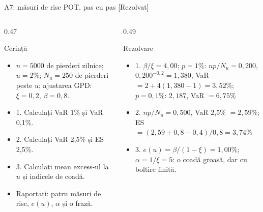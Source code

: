 \begin{frame}{A7: măsuri de risc POT, pas cu pas [Rezolvat]}
\itemsize{\scriptsize}
\begin{columns}[T]
\begin{column}{0.47\textwidth}
\begin{block}{Cerință}
\begin{itemize}
    \item $n = 5000$ de pierderi zilnice; $u = 2\%$; $N_u = 250$ de pierderi peste $u$; ajustarea GPD: $\xi = 0{,}2$, $\beta = 0{,}8$.
    \item 1. Calculați VaR 1\% și VaR 0,1\%.
    \item 2. Calculați VaR 2,5\% și ES 2,5\%.
    \item 3. Calculați mean excess-ul la $u$ și indicele de coadă.
    \item Raportați: patru măsuri de risc, $e(u)$, $\alpha$ și o frază.
\end{itemize}
\end{block}
\end{column}
\begin{column}{0.49\textwidth}
\begin{exampleblock}{Rezolvare}
\begin{itemize}
    \item 1. $\beta/\xi = 4{,}00$; $p = 1\%$: $np/N_u = 0{,}200$, $0{,}200^{-0{,}2} = 1{,}380$, VaR $= 2 + 4(1{,}380 - 1) = 3{,}52\%$; $p = 0{,}1\%$: $2{,}187$, VaR $= 6{,}75\%$
    \item 2. $np/N_u = 0{,}500$, VaR 2,5\% $= 2{,}59\%$; ES $= (2{,}59 + 0{,}8 - 0{,}4)/0{,}8 = 3{,}74\%$
    \item 3. $e(u) = \beta/(1 - \xi) = 1{,}00\%$; $\alpha = 1/\xi = 5$: o coadă groasă, dar cu boltire finită.
\end{itemize}
\end{exampleblock}
\end{column}
\end{columns}
\end{frame}


